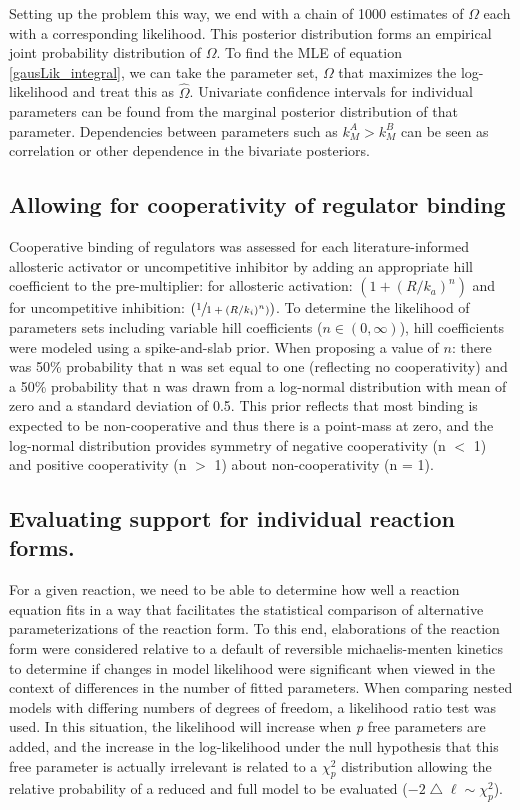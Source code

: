 \documentclass[12pt]{nature}\usepackage{graphicx, color}
\begin{document}
Setting up the problem this way, we end with a chain of 1000 estimates of $\Omega$ each with a corresponding likelihood.  This posterior distribution forms an empirical joint probability distribution of $\Omega$.  To find the MLE of equation \ref{gausLik_integral}, we can take the parameter set, $\Omega$ that maximizes the log-likelihood and treat this as $\hat{\Omega}$.   Univariate confidence intervals for individual parameters can be found from the marginal posterior distribution of that parameter.  Dependencies between parameters such as $k^{A}_{M} > k^{B}_{M}$ can be seen as correlation or other dependence in the bivariate posteriors.\\

\subsection{Allowing for cooperativity of regulator binding}

Cooperative binding of regulators was assessed for each literature-informed allosteric activator or uncompetitive inhibitor by adding an appropriate hill coefficient to the pre-multiplier: for allosteric activation: $(1 + (R/k_{a})^n)$ and for uncompetitive inhibition: $(\sfrac{1}{1 + (R/k_{i})^n)})$.  To determine the likelihood of parameters sets including variable hill coefficients ($n \in (0,\infty)$), hill coefficients were modeled using a spike-and-slab prior.  When proposing a value of $n$: there was 50\% probability that n was set equal to one (reflecting no cooperativity) and a 50\% probability that n was drawn from a log-normal distribution with mean of zero and a standard deviation of 0.5.  This prior reflects that most binding is expected to be non-cooperative and thus there is a point-mass at zero, and the log-normal distribution provides symmetry of negative cooperativity (n $<$ 1) and positive cooperativity (n $>$ 1) about non-cooperativity (n = 1).

\subsection{Evaluating support for individual reaction forms.}

For a given reaction, we need to be able to determine how well a reaction equation fits in a way that facilitates the statistical comparison of alternative parameterizations of the reaction form.  To this end, elaborations of the reaction form were considered relative to a default of reversible michaelis-menten kinetics to determine if changes in model likelihood were significant when viewed in the context of differences in the number of fitted parameters.  When comparing nested models with differing numbers of degrees of freedom, a likelihood ratio test was used.  In this situation, the likelihood will increase when \textit{p} free parameters are added, and the increase in the log-likelihood under the null hypothesis that this free parameter is actually irrelevant is related to a $\chi^{2}_{p}$ distribution allowing the relative probability of a reduced and full model to be evaluated ($-2\bigtriangleup\ell \sim \chi^{2}_{p}$).
\end{document}
